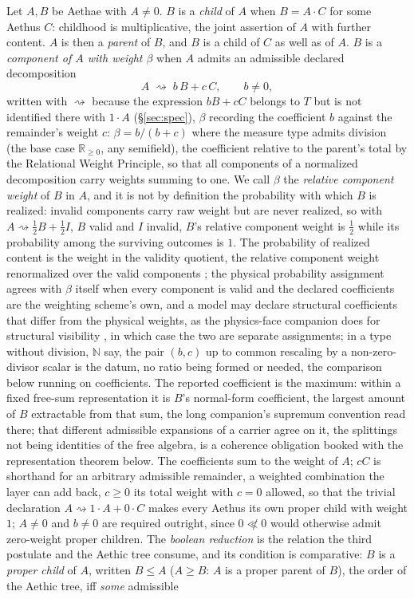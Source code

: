 \begin{defin}\label{def:child-proper}
Let $A, B$ be Aethae with $A \ne 0$. $B$ is a \emph{child} of $A$ when $B = A \cdot C$ for some Aethus $C$: childhood is multiplicative, the joint assertion of $A$ with further content. $A$ is then a \emph{parent} of $B$, and $B$ is a child of $C$ as well as of $A$. $B$ is a \emph{component of $A$ with weight $\beta$} when $A$ admits an admissible declared decomposition \[ A \;\rightsquigarrow\; b\,B + c\,C, \qquad b \ne 0, \] written with $\rightsquigarrow$ because the expression $bB + cC$ belongs to $T$ but is not identified there with $1 \cdot A$ (\S\ref{sec:spec}), $\beta$ recording the coefficient $b$ against the remainder's weight $c$: $\beta = b/(b + c)$ where the measure type admits division (the base case $\mathbb{R}_{\ge 0}$, any semifield), the coefficient relative to the parent's total by the Relational Weight Principle, so that all components of a normalized decomposition carry weights summing to one. We call $\beta$ the \emph{relative component weight} of $B$ in $A$, and it is not by definition the probability with which $B$ is realized: invalid components carry raw weight but are never realized, so with $A \rightsquigarrow \tfrac12 B + \tfrac12 I$, $B$ valid and $I$ invalid, $B$'s relative component weight is $\tfrac12$ while its probability among the surviving outcomes is $1$. The probability of realized content is the weight in the validity quotient, the relative component weight renormalized over the valid components \cite{Aethus}; the physical probability assignment agrees with $\beta$ itself when every component is valid and the declared coefficients are the weighting scheme's own, and a model may declare structural coefficients that differ from the physical weights, as the physics-face companion does for structural visibility \cite{AethusQuant}, in which case the two are separate assignments; in a type without division, $\mathbb{N}$ say, the pair $(b, c)$ up to common rescaling by a non-zero-divisor scalar is the datum, no ratio being formed or needed, the comparison below running on coefficients. The reported coefficient is the maximum: within a fixed free-sum representation it is $B$'s normal-form coefficient, the largest amount of $B$ extractable from that sum, the long companion's supremum convention read there; that different admissible expansions of a carrier agree on it, the splittings not being identities of the free algebra, is a coherence obligation booked with the representation theorem below. The coefficients sum to the weight of $A$; $cC$ is shorthand for an arbitrary admissible remainder, a weighted combination the layer can add back, $c \ge 0$ its total weight with $c = 0$ allowed, so that the trivial declaration $A \rightsquigarrow 1 \cdot A + 0 \cdot C$ makes every Aethus its own proper child with weight $1$; $A \ne 0$ and $b \ne 0$ are required outright, since $0 \not\ll 0$ would otherwise admit zero-weight proper children. The \emph{boolean reduction} is the relation the third postulate and the Aethic tree consume, and its condition is comparative: $B$ is a \emph{proper child} of $A$, written $B \le A$ ($A \ge B$: $A$ is a proper parent of $B$), the order of the Aethic tree, iff \emph{some} admissible 
\end{defin}
